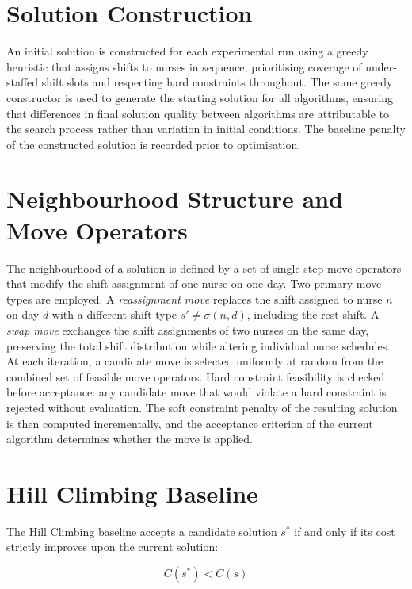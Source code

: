 \documentclass[12pt, a4paper, oneside]{report}
\begin{document}
\section{Solution Construction}
\label{sec:construction}

An initial solution is constructed for each experimental run using a
greedy heuristic that assigns shifts to nurses in sequence,
prioritising coverage of under-staffed shift slots and respecting
hard constraints throughout. The same greedy constructor is used to
generate the starting solution for all algorithms, ensuring that
differences in final solution quality between algorithms are
attributable to the search process rather than variation in initial
conditions. The baseline penalty of the constructed solution is
recorded prior to optimisation.

\section{Neighbourhood Structure and Move Operators}
\label{sec:neighbourhood}

The neighbourhood of a solution is defined by a set of single-step
move operators that modify the shift assignment of one nurse on one
day. Two primary move types are employed. A \textit{reassignment
move} replaces the shift assigned to nurse $n$ on day $d$ with a
different shift type $s' \neq \sigma(n, d)$, including the rest
shift. A \textit{swap move} exchanges the shift assignments of two
nurses on the same day, preserving the total shift distribution while
altering individual nurse schedules. At each iteration, a candidate
move is selected uniformly at random from the combined set of
feasible move operators. Hard constraint feasibility is checked
before acceptance: any candidate move that would violate a hard
constraint is rejected without evaluation. The soft constraint
penalty of the resulting solution is then computed incrementally, and
the acceptance criterion of the current algorithm determines whether
the move is applied.

\section{Hill Climbing Baseline}
\label{sec:hc_impl}

The Hill Climbing baseline accepts a candidate solution $s^*$ if and
only if its cost strictly improves upon the current solution:

\begin{equation}
    \label{eq:hc_accept}
    C(s^*) < C(s)
\end{equation}
\end{document}
